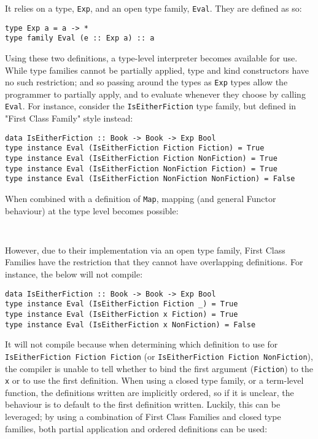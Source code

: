 \documentclass[12pt, a4paper, bibliography=totocnumbered]{scrreprt}
\newcommand{\inline}[1]{\lstinline[basicstyle=\ttfamily\footnotesize]{#1}}
\begin{document}
It relies on a type, \inline{Exp}, and an open type family, \inline{Eval}. They are defined as so:

\begin{lstlisting}
type Exp a = a -> *
type family Eval (e :: Exp a) :: a
\end{lstlisting}

Using these two definitions, a type-level interpreter becomes available for use. While type families cannot be partially applied, type and kind constructors have no such restriction; and so passing around the types as \inline{Exp} types allow the programmer to partially apply, and to evaluate whenever they choose by calling \inline{Eval}. For instance, consider the \inline{IsEitherFiction} type family, but defined in "First Class Family" style instead:

\begin{lstlisting}
data IsEitherFiction :: Book -> Book -> Exp Bool
type instance Eval (IsEitherFiction Fiction Fiction) = True
type instance Eval (IsEitherFiction Fiction NonFiction) = True
type instance Eval (IsEitherFiction NonFiction Fiction) = True
type instance Eval (IsEitherFiction NonFiction NonFiction) = False
\end{lstlisting}

When combined with a definition of \inline{Map}, mapping (and general Functor behaviour) at the type level becomes possible:

\begin{lstlisting}
    
\end{lstlisting}

However, due to their implementation via an open type family, First Class Families have the restriction that they cannot have overlapping definitions. For instance, the below will not compile:

\begin{lstlisting}
data IsEitherFiction :: Book -> Book -> Exp Bool
type instance Eval (IsEitherFiction Fiction _) = True
type instance Eval (IsEitherFiction x Fiction) = True
type instance Eval (IsEitherFiction x NonFiction) = False
\end{lstlisting}

It will not compile because when determining which definition to use for \inline{IsEitherFiction Fiction Fiction} (or \inline{IsEitherFiction Fiction NonFiction}), the compiler is unable to tell whether to bind the first argument (\inline{Fiction}) to the \inline{x} or to use the first definition. When using a closed type family, or a term-level function, the definitions written are implicitly ordered, so if it is unclear, the behaviour is to default to the first definition written. Luckily, this can be leveraged; by using a combination of First Class Families and closed type families, both partial application and ordered definitions can be used:
\end{document}

